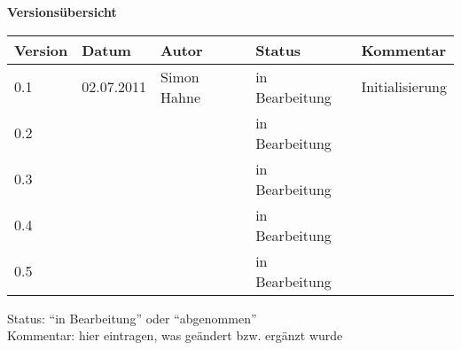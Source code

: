 
{\textbf{Versionsübersicht}}\\[2ex]

\begin{longtable}{|m{1.78cm}|m{1.59cm}|m{2.86cm}|m{1.9cm}|m{5.25cm}|}

  \hline                                              %

  \textbf{Version}  &    \textbf{Datum}  &    \textbf{Autor}  &
  \textbf{Status}   &    \textbf{Kommentar}  \\       %
  \hline                                              %

  0.1  &   02.07.2011  & Simon Hahne    &   in Bearbeitung    &    Initialisierung\\       %
  \hline
	0.2  &    &    &   in Bearbeitung    &  \\       %
  \hline   
	0.3  &     &   &    in Bearbeitung    &   \\       %
  \hline   
	0.4  &    &   &   in Bearbeitung    &    \\       %
  \hline   
	0.5  &     &  &   in Bearbeitung    &    \\       %
  \hline   %

\end{longtable}
Status: "`in Bearbeitung"' oder "`abgenommen"'\\
Kommentar: hier eintragen, was geändert bzw. ergänzt wurde

